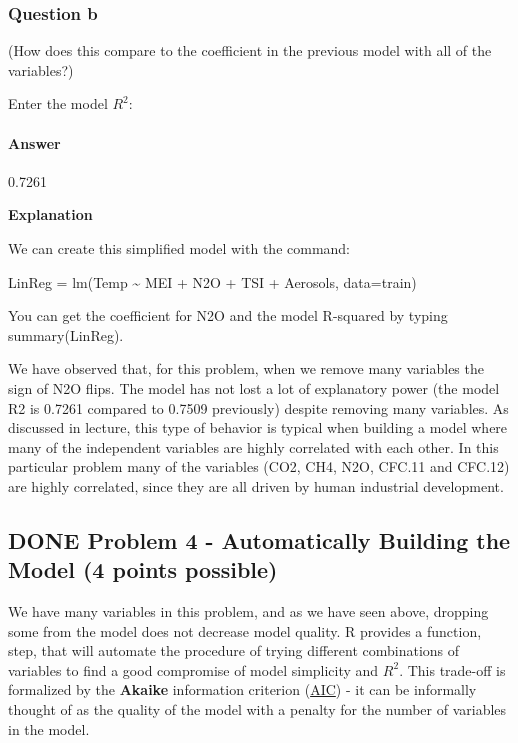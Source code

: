 \documentclass[letterpaper, 9pt, onecolumn, twoside, technote, final]{IEEEtran}
\begin{document}
\subsubsection{Question b}
\label{sec-1-5-2}

(How does this compare to the coefficient in the previous model with
all of the variables?)

Enter the model $R^2$:

\paragraph{Answer}
\label{sec-1-5-2-1}

0.7261

\textbf{Explanation}

We can create this simplified model with the command:

LinReg = lm(Temp \textasciitilde{} MEI + N2O + TSI + Aerosols, data=train)

You can get the coefficient for N2O and the model R-squared by typing
summary(LinReg).

We have observed that, for this problem, when we remove many variables
the sign of N2O flips. The model has not lost a lot of explanatory
power (the model R2 is 0.7261 compared to 0.7509 previously) despite
removing many variables. As discussed in lecture, this type of
behavior is typical when building a model where many of the
independent variables are highly correlated with each other. In this
particular problem many of the variables (CO2, CH4, N2O, CFC.11 and
CFC.12) are highly correlated, since they are all driven by human
industrial development.

\subsection{{\bfseries\sffamily DONE} Problem 4 - Automatically Building the Model (4 points possible)}
\label{sec-1-6}
We have many variables in this problem, and as we have seen above,
dropping some from the model does not decrease model quality. R
provides a function, step, that will automate the procedure of trying
different combinations of variables to find a good compromise of model
simplicity and $R^2$. This trade-off is formalized by the \textbf{Akaike}
information criterion (\href{http://en.wikipedia.org/wiki/Akaike_information_criterion}{AIC}) - it can be informally thought of as the
quality of the model with a penalty for the number of variables in the
model.
\end{document}
